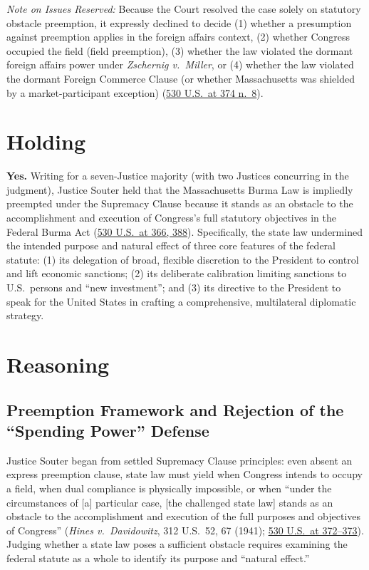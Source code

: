 \documentclass[12pt]{article}
\begin{document}
\textit{Note on Issues Reserved:} Because the Court resolved the case solely on statutory obstacle preemption, it expressly declined to decide (1) whether a presumption against preemption applies in the foreign affairs context, (2) whether Congress occupied the field (field preemption), (3) whether the law violated the dormant foreign affairs power under \textit{Zschernig v.\ Miller}, or (4) whether the law violated the dormant Foreign Commerce Clause (or whether Massachusetts was shielded by a market-participant exception) (\href{https://www.law.cornell.edu/supct/html/99-474.ZO.html}{530 U.S.\ at 374 n.\ 8}).

\section{Holding}

\textbf{Yes.} Writing for a seven-Justice majority (with two Justices concurring in the judgment), Justice Souter held that the Massachusetts Burma Law is impliedly preempted under the Supremacy Clause because it stands as an obstacle to the accomplishment and execution of Congress's full statutory objectives in the Federal Burma Act (\href{https://www.law.cornell.edu/supct/html/99-474.ZO.html}{530 U.S.\ at 366, 388}). Specifically, the state law undermined the intended purpose and natural effect of three core features of the federal statute: (1) its delegation of broad, flexible discretion to the President to control and lift economic sanctions; (2) its deliberate calibration limiting sanctions to U.S.\ persons and ``new investment''; and (3) its directive to the President to speak for the United States in crafting a comprehensive, multilateral diplomatic strategy.

\section{Reasoning}

\subsection{Preemption Framework and Rejection of the ``Spending Power'' Defense}
Justice Souter began from settled Supremacy Clause principles: even absent an express preemption clause, state law must yield when Congress intends to occupy a field, when dual compliance is physically impossible, or when ``under the circumstances of [a] particular case, [the challenged state law] stands as an obstacle to the accomplishment and execution of the full purposes and objectives of Congress'' (\textit{Hines v.\ Davidowitz}, 312 U.S.\ 52, 67 (1941); \href{https://caselaw.findlaw.com/court/us-supreme-court/530/363.html}{530 U.S.\ at 372--373}). Judging whether a state law poses a sufficient obstacle requires examining the federal statute as a whole to identify its purpose and ``natural effect.''
\end{document}
